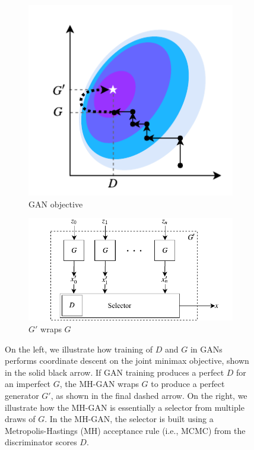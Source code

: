 \documentclass{article}
\begin{document}
\begin{figure}[bhtp]
    \centering
    \begin{subfigure}[t]{2.25in}
       \centering
       \includegraphics[scale=1.0]{figures/coord_descent.pdf}
       \caption{GAN objective}
    \end{subfigure}
    \hfill
    \begin{subfigure}[t]{3in}
       \centering
       \includegraphics[scale=1.0]{figures/block_diag.pdf}
       \caption{$G'$ wraps $G$}
    \end{subfigure}
    \caption{{\small
    On the left, we illustrate how training of $D$ and $G$ in GANs performs coordinate descent on the joint minimax objective, shown in the solid black arrow.
    If GAN training produces a perfect $D$ for an imperfect $G$, the MH-GAN wraps $G$ to produce a perfect generator $G'$, as shown in the final dashed arrow.
    On the right, we illustrate how the MH-GAN is essentially a selector from multiple draws of $G$.
    In the MH-GAN, the selector is built using a Metropolis-Hastings (MH) acceptance rule (i.e., MCMC) from the discriminator scores $D$.
    }}
    \label{fig:block_diag}
\end{figure}
\end{document}
